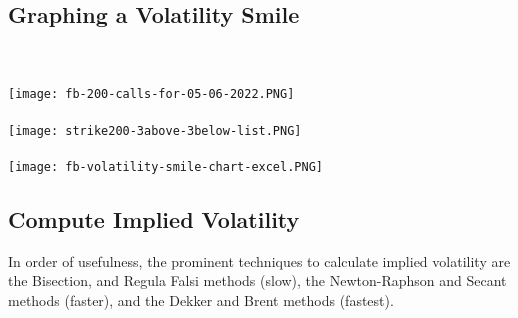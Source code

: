 \documentclass{article}
\begin{document}
\newpage
\subsection{Graphing a Volatility Smile} 
\\\\
    \texttt{[image: fb-200-calls-for-05-06-2022.PNG]} 
\\\\
    \texttt{[image: strike200-3above-3below-list.PNG]}
\\\\
    \texttt{[image: fb-volatility-smile-chart-excel.PNG]}

\newpage
\subsection{Compute Implied Volatility} 

In order of usefulness, the prominent techniques to calculate implied volatility are the Bisection, and Regula Falsi methods (slow), the Newton-Raphson and Secant methods (faster), and the Dekker and Brent  methods (fastest).
\end{document}
